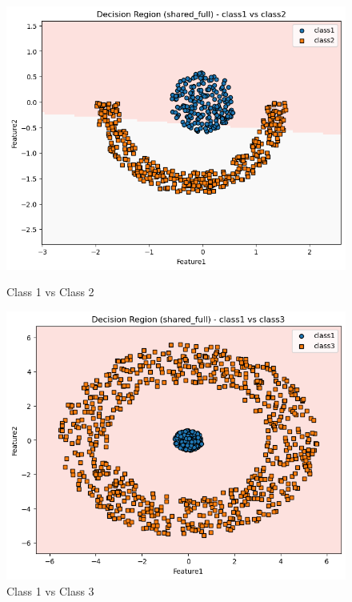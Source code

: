 \begin{figure}[H]
    \centering
    \begin{minipage}{0.32\linewidth}
        \includegraphics[width=\linewidth]{images/NLS_Group04_images/02_shared_full/02_decision_region_c1_c2.png}
        \caption*{Class 1 vs Class 2}
    \end{minipage}
    \hfill
    \begin{minipage}{0.32\linewidth}
        \includegraphics[width=\linewidth]{images/NLS_Group04_images/02_shared_full/03_decision_region_c1_c3.png}
        \caption*{Class 1 vs Class 3}
    \end{minipage}
    \hfill

\end{figure}
